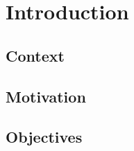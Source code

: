 \section{Introduction}
\label{sec:introduction}

\subsection{Context}
\label{subsec:context}

\vspace{1cm}
\begin{center}
  \begin{Huge}
    [CONTEXT]
  \end{Huge}
\end{center}
\vspace{1cm}

\subsection{Motivation}
\label{subsec:motivation}

\vspace{1cm}
\begin{center}
  \begin{Huge}
    [MOTIVATION]
  \end{Huge}
\end{center}
\vspace{1cm}

\subsection{Objectives}
\label{subsec:objectives}

\vspace{1cm}
\begin{center}
  \begin{Huge}
    [OBJECTIVES]
  \end{Huge}
\end{center}
\vspace{1cm}
